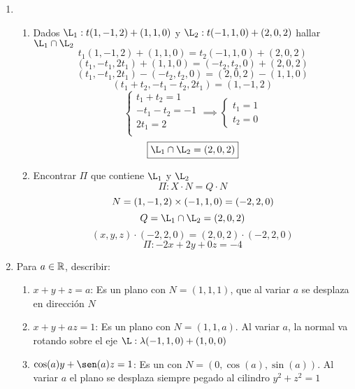 \documentclass[../practica.root.tex]{subfiles}
\begin{document}
\begin{enumerate}
    \item \begin{enumerate}
              \item Dados $\L_1 : t(1, -1, 2) + (1, 1, 0)$ y $\L_2 : t(-1, 1, 0) + (2, 0, 2)$ hallar $\L_1 \cap \L_2$
                    \[ t_1(1, -1, 2) + (1, 1, 0) = t_2(-1, 1, 0) + (2, 0, 2) \]
                    \[ (t_1, -t_1, 2t_1) + (1, 1, 0) = (-t_2, t_2, 0) + (2, 0, 2) \]
                    \[ (t_1, -t_1, 2t_1) - (-t_2, t_2, 0) = (2, 0, 2) - (1, 1, 0) \]
                    \[ (t_1 + t_2, -t_1 - t_2, 2t_1) = (1, -1, 2) \]
                    \[
                        \begin{cases}
                            t_1 + t_2 = 1   \\
                            -t_1 - t_2 = -1 \\
                            2t_1 = 2        \\
                        \end{cases}
                        \implies
                        \begin{cases}
                            t_1 = 1 \\
                            t_2 = 0
                        \end{cases}
                    \] \[
                        \boxed{\L_1 \cap \L_2 = (2, 0, 2)}
                    \]
              \item Encontrar $\Pi$ que contiene $\L_1$  y $\L_2$
                    \[ \Pi : X \cdot N = Q \cdot N\]
                    \[ N = (1, -1, 2)\times(-1, 1, 0) = (-2, 2, 0) \]
                    \[ Q = \L_1 \cap \L_2 = (2, 0, 2)\]
                    \[ (x, y, z)\cdot(-2, 2, 0) = (2, 0, 2)\cdot(-2, 2, 0) \]
                    \[ \boxed{ \Pi : -2x + 2y + 0z = -4} \]
          \end{enumerate}

    \item Para $a \in \mathbb{R}$, describir:
          \begin{enumerate}
              \item $x + y + z = a$: Es un plano con $N = (1, 1, 1)$, que al variar $a$ se desplaza en dirección $N$
              \item $x + y + az = 1$: Es un plano con $N = (1, 1, a)$. Al variar $a$, la normal va rotando sobre el eje $\L : \lambda(-1,1,0) + (1, 0, 0)$
              \item $\cos(a)y + \sen(a)z = 1$: Es un con $N = (0, \cos(a), \sin(a))$. Al variar $a$ el plano se desplaza siempre pegado al cilindro $y^2 + z^2 = 1$
          \end{enumerate}



\end{enumerate}
\end{document}
